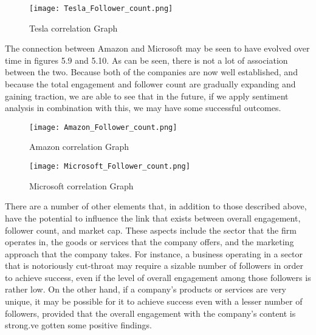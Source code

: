 \documentclass[12pt, a4paper,twoside]{report}
\theoremstyle{plain} %
\theoremstyle{definition} %
\theoremstyle{remark} %
\numberwithin{equation}{chapter}
\begin{document}
    \begin{figure}
        \centering
        \texttt{[image: Tesla\_Follower\_count.png]}
        \caption{Tesla correlation Graph}
        \label{fig:Tesla corelation Graph}
    \end{figure}
    
    The connection between Amazon and Microsoft may be seen to have evolved over time in figures 5.9 and 5.10. As can be seen, there is not a lot of association between the two. Because both of the companies are now well established, and because the total engagement and follower count are gradually expanding and gaining traction, we are able to see that in the future, if we apply sentiment analysis in combination with this, we may have some successful outcomes. 

    \begin{figure}
        \centering
        \texttt{[image: Amazon\_Follower\_count.png]}
        \caption{Amazon correlation Graph}
        \label{fig:Amazon corelation Graph}
    \end{figure}
    
    \begin{figure}
        \centering
        \texttt{[image: Microsoft\_Follower\_count.png]}
        \caption{Microsoft correlation Graph}
        \label{fig:Microsoft corelation Graph}
    \end{figure}
    There are a number of other elements that, in addition to those described above, have the potential to influence the link that exists between overall engagement, follower count, and market cap. These aspects include the sector that the firm operates in, the goods or services that the company offers, and the marketing approach that the company takes. For instance, a business operating in a sector that is notoriously cut-throat may require a sizable number of followers in order to achieve success, even if the level of overall engagement among those followers is rather low. On the other hand, if a company's products or services are very unique, it may be possible for it to achieve success even with a lesser number of followers, provided that the overall engagement with the company's content is strong.ve gotten some positive findings. 
\end{document}
